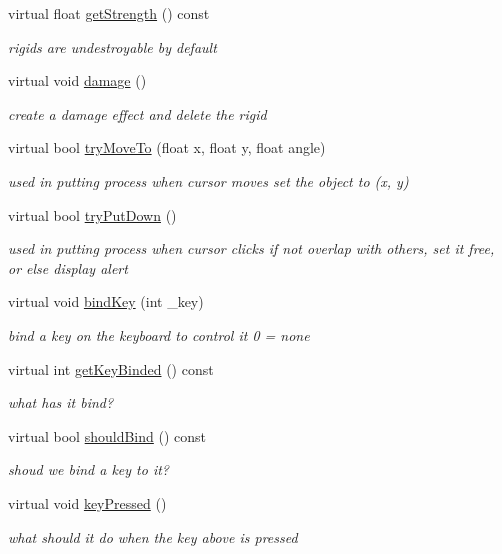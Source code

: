 \begin{DoxyCompactItemize}
\item 
virtual float \hyperlink{classRigid_aac83bf941605a8cbccf06a5d4b200fee}{get\+Strength} () const 
\begin{DoxyCompactList}\small\item\em rigids are undestroyable by default \end{DoxyCompactList}\item 
virtual void \hyperlink{classRigid_a0b64c3d4381acc32987c18d6746f8e35}{damage} ()
\begin{DoxyCompactList}\small\item\em create a damage effect and delete the rigid \end{DoxyCompactList}\item 
virtual bool \hyperlink{classRigid_ae3c9c8703eab644d622f60208eb5c2cf}{try\+Move\+To} (float x, float y, float angle)
\begin{DoxyCompactList}\small\item\em used in putting process when cursor moves set the object to (x, y) \end{DoxyCompactList}\item 
virtual bool \hyperlink{classRigid_ab9f52207acc82810d4aecdbef59d25fc}{try\+Put\+Down} ()
\begin{DoxyCompactList}\small\item\em used in putting process when cursor clicks if not overlap with others, set it free, or else display alert \end{DoxyCompactList}\item 
virtual void \hyperlink{classRigid_a5d8922b10420ad452b6d9400d5ecc511}{bind\+Key} (int \+\_\+key)
\begin{DoxyCompactList}\small\item\em bind a key on the keyboard to control it 0 = none \end{DoxyCompactList}\item 
virtual int \hyperlink{classRigid_a4e5382b25c00ff97745b04120e51cb56}{get\+Key\+Binded} () const 
\begin{DoxyCompactList}\small\item\em what has it bind? \end{DoxyCompactList}\item 
virtual bool \hyperlink{classRigid_a213d4ddd819ea799b7a29961b0d66f39}{should\+Bind} () const 
\begin{DoxyCompactList}\small\item\em shoud we bind a key to it? \end{DoxyCompactList}\item 
virtual void \hyperlink{classRigid_a769957138e3ca40a4a6b1da4cf52eea8}{key\+Pressed} ()
\begin{DoxyCompactList}\small\item\em what should it do when the key above is pressed \end{DoxyCompactList}\end{DoxyCompactItemize}
